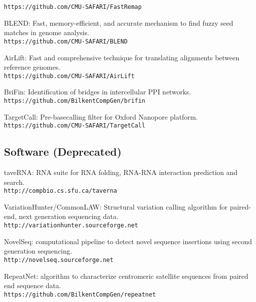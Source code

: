 \begin{list2}
{\tt https://github.com/CMU-SAFARI/FastRemap}
  \item
BLEND: Fast, memory-efficient, and accurate mechanism to find fuzzy seed matches in genome analysis.\\
{\tt https://github.com/CMU-SAFARI/BLEND}
  \item
AirLift: Fast and comprehensive technique for translating alignments between reference genomes.\\
{\tt https://github.com/CMU-SAFARI/AirLift}
\item 
BriFin: Identification of bridges in intercellular PPI networks.\\
{\tt https://github.com/BilkentCompGen/brifin}
\item 
TargetCall: Pre-basecalling filter for Oxford Nanopore platform.\\
{\tt https://github.com/CMU-SAFARI/TargetCall}
\end{list2}

\subsection{\small \sc Software (Deprecated)}
\begin{list2}
\item
  taveRNA: RNA suite for RNA folding, RNA-RNA interaction prediction and search. \\
  {\tt http://compbio.cs.sfu.ca/taverna}
\item
  VariationHunter/CommonLAW: Structural variation calling algorithm for paired-end, next
  generation sequencing data.
  {\tt http://variationhunter.sourceforge.net}
\item
  NovelSeq: computational pipeline to detect novel sequence insertions using second generation sequencing.\\
  {\tt http://novelseq.sourceforge.net}
\item
  RepeatNet: algorithm to characterize centromeric satellite sequences from paired end sequence data.\\
  {\tt https://github.com/BilkentCompGen/repeatnet}
\end{list2}






